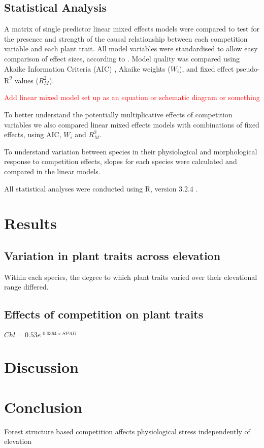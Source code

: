 \documentclass[a4paper,11pt]{article}
\newcommand{\todo}[1]{\textcolor{red}{#1}}   %
\begin{document}
\subsection*{Statistical Analysis}
A matrix of single predictor linear mixed effects models were compared to test for the presence and strength of the causal relationship between each competition variable and each plant trait. All model variables were standardised to allow easy comparison of effect sizes, according to \citep{Gelman2008, Grueber2011, Gelman2014}. Model quality was compared using Akaike Information Criteria (AIC) \citep{Akaike1998}, Akaike weights ($W_i$), and fixed effect pseudo-R\textsuperscript{2} values ($R_M^2$). 

\todo{Add linear mixed model set up as an equation or schematic diagram or something}

To better understand the potentially multiplicative effects of competition variables we also compared linear mixed effects models with combinations of fixed effects, using AIC, $W_i$ and $R_M^2$. 

To understand variation between species in their physiological and morphological response to competition effects, slopes for each species were calculated and compared in the linear models. 


All statistical analyses were conducted using R, version 3.2.4 \citep{R2016}.

\section*{Results}

\subsection{Variation in plant traits across elevation}

Within each species, the degree to which plant traits varied over their elevational range differed.



\subsection{Effects of competition on plant traits}



   $Chl = 0.53e^{\begin{matrix} 0.0364 \times SPAD \end{matrix}}$

\section*{Discussion}

\section*{Conclusion}


Forest structure based competition affects physiological stress independently of elevation

\end{document}
